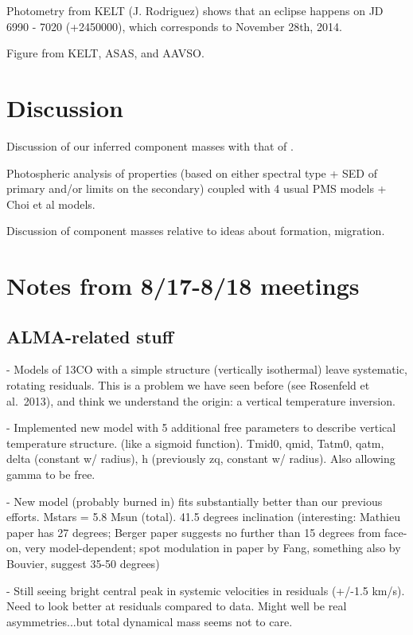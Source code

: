 \documentclass{aastex6}
\begin{document}
Photometry from KELT (J. Rodriguez) shows that an eclipse happens on JD 6990 - 7020 (+2450000), which corresponds to November 28th, 2014. 

Figure from KELT, ASAS, and AAVSO.

\section{Discussion}

Discussion of our inferred component masses with that of \citet{berger11}. 

Photospheric analysis of properties (based on either spectral type + SED of primary and/or limits on the secondary) coupled with 4 usual PMS models + Choi et al models.

Discussion of component masses relative to ideas about formation, migration.


\section{Notes from 8/17-8/18 meetings}

\subsection{ALMA-related stuff}

- Models of 13CO with a simple structure (vertically isothermal) leave systematic, rotating residuals.  This is a problem we have seen before (see Rosenfeld et al.~2013), and think we understand the origin: a vertical temperature inversion.

- Implemented new model with 5 additional free parameters to describe vertical temperature structure.  (like a sigmoid function).  {Tmid0, qmid, Tatm0, qatm, delta (constant w/ radius), h (previously zq, constant w/ radius)}.  Also allowing gamma to be free.

- New model (probably burned in) fits substantially better than our previous efforts.  Mstars = 5.8 Msun (total).  41.5 degrees inclination (interesting: Mathieu paper has 27 degrees; Berger paper suggests no further than 15 degrees from face-on, very model-dependent; spot modulation in paper by Fang, something also by Bouvier, suggest 35-50 degrees)

- Still seeing bright central peak in systemic velocities in residuals (+/-1.5 km/s).  Need to look better at residuals compared to data.  Might well be real asymmetries...but total dynamical mass seems not to care.
\end{document}
